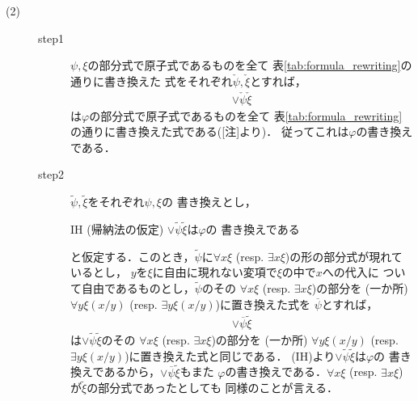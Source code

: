 \begin{metaprf}
\begin{description}
			\item[(2)]		
				\begin{description}
					\item[step1]
						$\psi,\xi$の部分式で原子式であるものを全て
						表\ref{tab:formula_rewriting}の通りに書き換えた
						式をそれぞれ$\check{\psi},\check{\xi}$とすれば，
						\begin{align}
							\vee \check{\psi} \check{\xi}
						\end{align}
						は$\varphi$の部分式で原子式であるものを全て
						表\ref{tab:formula_rewriting}の通りに書き換えた式である([注]より)．
						従ってこれは$\varphi$の書き換えである．
								
					\item[step2]
						$\widetilde{\psi},\widetilde{\xi}$をそれぞれ$\psi,\xi$の
						書き換えとし，
						\begin{itembox}[l]{IH (帰納法の仮定)}
							$\vee \widetilde{\psi} \widetilde{\xi}$は$\varphi$の
							書き換えである
						\end{itembox}
						と仮定する．このとき，$\widetilde{\psi}$に$\forall x \xi$ 
						(resp. $\exists x \xi$)の形の部分式が現れているとし，
						$y$を$\xi$に自由に現れない変項で$\xi$の中で$x$への代入に
						ついて自由であるものとし，$\widetilde{\psi}$のその
						$\forall x \xi$ (resp. $\exists x \xi$)の部分を
						(一か所) $\forall y \xi(x/y)$
						(resp. $\exists y \xi(x/y)$)に置き換えた式を
						$\overline{\psi}$とすれば，
						\begin{align}
							\vee \overline{\psi} \widetilde{\xi}
						\end{align}
						は$\vee \widetilde{\psi} \widetilde{\xi}$のその
						$\forall x \xi$ (resp. $\exists x \xi$)の部分を
						(一か所) $\forall y \xi(x/y)$
						(resp. $\exists y \xi(x/y)$)に置き換えた式と同じである．
						(IH)より$\vee \widetilde{\psi} \widetilde{\xi}$は$\varphi$の
						書き換えであるから，$\vee \overline{\psi} \widetilde{\xi}$もまた
						$\varphi$の書き換えである．$\forall x \xi$ 
						(resp. $\exists x \xi$)が$\widetilde{\xi}$の部分式であったとしても
						同様のことが言える．
						\QED
				\end{description}
		\end{description}
	\end{metaprf}
	
